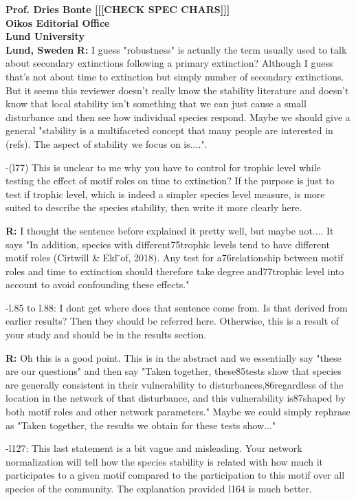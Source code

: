 \documentclass[12pt]{letter}
\begin{document}
\begin{letter}{\bf Prof. Dries Bonte [[[CHECK SPEC CHARS]]]\\
Oikos Editorial Office \\
Lund University \\
Lund, Sweden}
    \textbf{R:}
    I guess "robustness" is actually the term usually used to talk about secondary extinctions following a primary extinction? Although I guess that's not about time to extinction but simply number of secondary extinctions. But it seems this reviewer doesn't really know the stability literature and doesn't know that local stability isn't something that we can just cause a small disturbance and then see how individual species respond. Maybe we should give a general "stability is a multifaceted concept that many people are interested in (refs). The aspect of stability we focus on is....".

    -(l77) This is unclear to me why you have to control for trophic level while testing the effect of motif roles on time to extinction? If the purpose is just to test if trophic level, which is indeed a simpler species level measure, is more suited to describe the species stability, then write it more clearly here.

    \textbf{R:}
    I thought the sentence before explained it pretty well, but maybe not.... It says "In addition, species with different75trophic levels tend to have different motif roles (Cirtwill & Ekl ̈of, 2018). Any test for a76relationship between motif roles and time to extinction should therefore take degree and77trophic level into account to avoid confounding these effects."

    -l.85 to l.88: I dont get where does that sentence come from. Is that derived from earlier results? Then they should be referred here. Otherwise, this is a result of your study and should be in the results section.

    \textbf{R:}
    Oh this is a good point. This is in the abstract and we essentially say "these are our questions" and then say "Taken together, these85tests show that species are generally consistent in their vulnerability to disturbances,86regardless of the location in the network of that disturbance, and this vulnerability is87shaped by both motif roles and other network parameters." Maybe we could simply rephrase as "Taken together, the results we obtain for these tests show..."

    -l127: This last statement is a bit vague and misleading. Your network normalization will tell how the species stability is related with how much it participates to a given motif compared to the participation to this motif over all species of the community. The explanation provided l164 is much better.


\end{letter}
\end{document}
